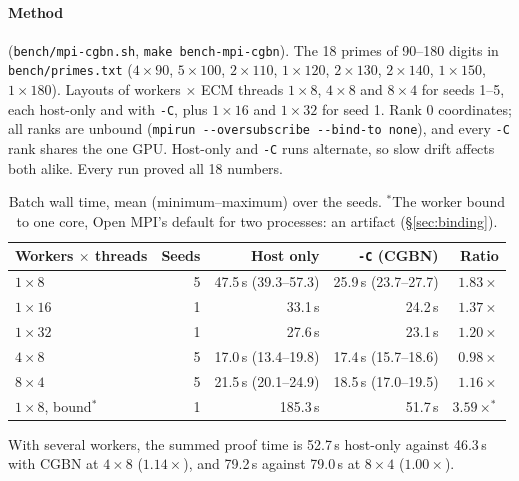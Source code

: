 \documentclass[11pt,a4paper]{article}
\newcommand{\code}[1]{\texttt{#1}}
\begin{document}
\paragraph{Method} (\code{bench/mpi-cgbn.sh}, \code{make bench-mpi-cgbn}).
The 18 primes of 90--180 digits in \code{bench/primes.txt} ($4 \times 90$,
$5 \times 100$, $2 \times 110$, $1 \times 120$, $2 \times 130$, $2 \times
140$, $1 \times 150$, $1 \times 180$). Layouts of workers $\times$ ECM
threads $1 \times 8$, $4 \times 8$ and $8 \times 4$ for seeds 1--5, each
host-only and with \code{-C}, plus $1 \times 16$ and $1 \times 32$ for seed
1. Rank 0 coordinates; all ranks are unbound (\code{mpirun -{}-oversubscribe
-{}-bind-to none}), and every \code{-C} rank shares the one GPU. Host-only
and \code{-C} runs alternate, so slow drift affects both alike. Every run
proved all 18 numbers.

\begin{table}[ht]
\centering
\begin{tabular}{lrrrr}
\toprule
Workers $\times$ threads & Seeds & Host only & \code{-C} (CGBN) & Ratio \\
\midrule
$1 \times 8$  & 5 & 47.5\,s (39.3--57.3) & 25.9\,s (23.7--27.7) & $1.83\times$ \\
$1 \times 16$ & 1 & 33.1\,s & 24.2\,s & $1.37\times$ \\
$1 \times 32$ & 1 & 27.6\,s & 23.1\,s & $1.20\times$ \\
$4 \times 8$  & 5 & 17.0\,s (13.4--19.8) & 17.4\,s (15.7--18.6) & $0.98\times$ \\
$8 \times 4$  & 5 & 21.5\,s (20.1--24.9) & 18.5\,s (17.0--19.5) & $1.16\times$ \\
\midrule
$1 \times 8$, bound$^{*}$ & 1 & 185.3\,s & 51.7\,s & $3.59\times^{*}$ \\
\bottomrule
\end{tabular}
\caption{Batch wall time, mean (minimum--maximum) over the seeds.
  $^{*}$The worker bound to one core, Open MPI's default for two processes:
  an artifact (\S\ref{sec:binding}).}
\label{tab:mpi}
\end{table}

With several workers, the summed proof time is 52.7\,s host-only against
46.3\,s with CGBN at $4 \times 8$ ($1.14\times$), and 79.2\,s against
79.0\,s at $8 \times 4$ ($1.00\times$).
\end{document}
